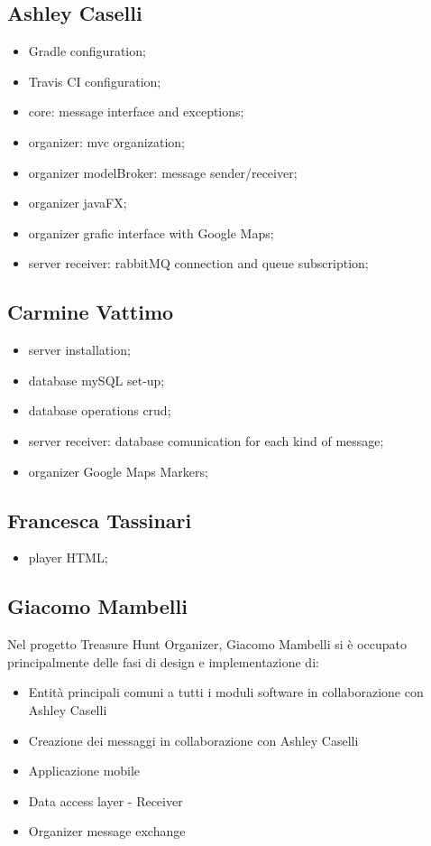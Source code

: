 \documentclass[12pt, italian]{article}
\begin{document}
\subsection{Ashley Caselli}
\begin{itemize}
	\item Gradle configuration;
	\item Travis CI configuration;
	\item core: message interface and exceptions;
	\item organizer: mvc organization;
	\item organizer modelBroker: message sender/receiver;
	\item organizer javaFX;
	\item organizer grafic interface with Google Maps;
	\item server receiver: rabbitMQ connection and queue subscription;
\end{itemize}
\subsection{Carmine Vattimo}
\begin{itemize}
	\item server installation;
	\item database mySQL set-up;
	\item database operations crud;
	\item server receiver: database comunication for each kind of message;
	\item organizer Google Maps Markers;
\end{itemize}
\subsection{Francesca Tassinari}
\begin{itemize}
	\item player HTML;
\end{itemize}
\subsection{Giacomo Mambelli}
Nel progetto Treasure Hunt Organizer, Giacomo Mambelli si è occupato principalmente delle fasi di design e implementazione di:
\begin{itemize}
	\item Entità principali comuni a tutti i moduli software in collaborazione con Ashley Caselli
	\item Creazione dei messaggi in collaborazione con Ashley Caselli
	\item Applicazione mobile
	\item Data access layer - Receiver
	\item Organizer message exchange
\end{itemize}
\end{document}
